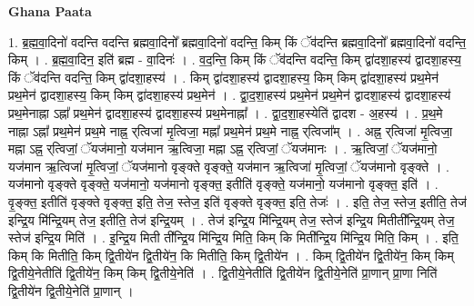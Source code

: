 \documentclass[17pt]{extarticle}
\begin{document}
\textbf{Ghana Paata } \newline

1. ब्र॒ह्म॒वा॒दिनो॑ वदन्ति वदन्ति ब्रह्मवा॒दिनो᳚ ब्रह्मवा॒दिनो॑ वदन्ति॒ किम् किं ॅव॑दन्ति ब्रह्मवा॒दिनो᳚ ब्रह्मवा॒दिनो॑ वदन्ति॒ किम् । . ब्र॒ह्म॒वा॒दिन॒ इति॑ ब्रह्म - वा॒दिनः॑ । . व॒द॒न्ति॒ किम् किं ॅव॑दन्ति वदन्ति॒ किम् द्वा॑दशा॒हस्य॑ द्वादशा॒हस्य॒ किं ॅव॑दन्ति वदन्ति॒ किम् द्वा॑दशा॒हस्य॑ । . किम् द्वा॑दशा॒हस्य॑ द्वादशा॒हस्य॒ किम् किम् द्वा॑दशा॒हस्य॑ प्रथ॒मेन॑ प्रथ॒मेन॑ द्वादशा॒हस्य॒ किम् किम् द्वा॑दशा॒हस्य॑ प्रथ॒मेन॑ । . द्वा॒द॒शा॒हस्य॑ प्रथ॒मेन॑ प्रथ॒मेन॑ द्वादशा॒हस्य॑ द्वादशा॒हस्य॑ प्रथ॒मेनाह्ना ऽह्ना᳚ प्रथ॒मेन॑ द्वादशा॒हस्य॑ द्वादशा॒हस्य॑ प्रथ॒मेनाह्ना᳚ । . द्वा॒द॒शा॒हस्येति॑ द्वादश - अ॒हस्य॑ । . प्र॒थ॒मे नाह्ना ऽह्ना᳚ प्रथ॒मेन॑ प्रथ॒मे नाह्न॒ र्‌त्विजा॑ मृ॒त्विजा॒ मह्ना᳚ प्रथ॒मेन॑ प्रथ॒मे नाह्न॒ र्‌त्विजा᳚म् । . अह्न॒ र्‌त्विजा॑ मृ॒त्विजा॒ मह्ना ऽह्न॒ र्‌त्विजां॒ ॅयज॑मानो॒ यज॑मान ऋ॒त्विजा॒ मह्ना ऽह्न॒ र्‌त्विजां॒ ॅयज॑मानः । . ऋ॒त्विजां॒ ॅयज॑मानो॒ यज॑मान ऋ॒त्विजा॑ मृ॒त्विजां॒ ॅयज॑मानो वृङ्क्ते वृङ्क्ते॒ यज॑मान ऋ॒त्विजा॑ मृ॒त्विजां॒ ॅयज॑मानो वृङ्क्ते । . यज॑मानो वृङ्क्ते वृङ्क्ते॒ यज॑मानो॒ यज॑मानो वृङ्क्त॒ इतीति॑ वृङ्क्ते॒ यज॑मानो॒ यज॑मानो वृङ्क्त॒ इति॑ । . वृ॒ङ्क्त॒ इतीति॑ वृङ्क्ते वृङ्क्त॒ इति॒ तेज॒ स्तेज॒ इति॑ वृङ्क्ते वृङ्क्त॒ इति॒ तेजः॑ । . इति॒ तेज॒ स्तेज॒ इतीति॒ तेज॑ इन्द्रि॒य मि॑न्द्रि॒यम् तेज॒ इतीति॒ तेज॑ इन्द्रि॒यम् । . तेज॑ इन्द्रि॒य मि॑न्द्रि॒यम् तेज॒ स्तेज॑ इन्द्रि॒य मितीती᳚न्द्रि॒यम् तेज॒ स्तेज॑ इन्द्रि॒य मिति॑ । . इ॒न्द्रि॒य मिती ती᳚न्द्रि॒य मि॑न्द्रि॒य मिति॒ किम् कि मिती᳚न्द्रि॒य मि॑न्द्रि॒य मिति॒ किम् । . इति॒ किम् कि मितीति॒ किम् द्वि॒तीये॑न द्वि॒तीये॑न॒ कि मितीति॒ किम् द्वि॒तीये॑न । . किम् द्वि॒तीये॑न द्वि॒तीये॑न॒ किम् किम् द्वि॒तीये॒नेतीति॑ द्वि॒तीये॑न॒ किम् किम् द्वि॒तीये॒नेति॑ । . द्वि॒तीये॒नेतीति॑ द्वि॒तीये॑न द्वि॒तीये॒नेति॑ प्रा॒णान् प्रा॒णा निति॑ द्वि॒तीये॑न द्वि॒तीये॒नेति॑ प्रा॒णान् । \newline
\end{document}

